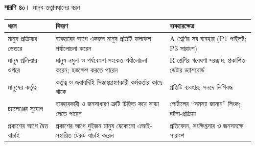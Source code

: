 \documentclass[border=10pt]{standalone}
\begin{document}
\begin{minipage}{17cm}
{\large\bfseries সারণি ৪০।}\ {\large মানব-তত্ত্বাবধানের ধরন}\par\vspace{7pt}
\small
{}
\begin{tabularx}{\linewidth}{@{}>{\hsize=0.712\hsize\raggedright\arraybackslash}X>{\hsize=1.312\hsize\raggedright\arraybackslash}X>{\hsize=0.975\hsize\raggedright\arraybackslash}X@{}}
\arrayrulecolor{bapilrule}\toprule
\rowcolor{white}\textbf{ধরন} & \textbf{বিবরণ} & \textbf{ব্যবহারক্ষেত্র} \\
\midrule
মানুষ প্রক্রিয়ার ভেতরে & ব্যবহারের আগে একজন মানুষ প্রতিটি ফলাফল পর্যালোচনা করেন & A শ্রেণির সব ব্যবহার (P1 পাইলট; P3 সারাংশ) \\
মানুষ প্রক্রিয়ার ওপরে & মানুষ নমুনা ও পর্যবেক্ষণ-সংকেত পর্যালোচনা করেন; হস্তক্ষেপ করতে পারেন & R শ্রেণির গবেষণা-সরঞ্জাম; প্রকাশিত ডেটার ড্যাশবোর্ড \\
মানুষের কর্তৃত্ব & কর্তৃত্ব ও জবাবদিহি সিদ্ধান্তগ্রহণকারী কর্মকর্তার কাছে থাকে & প্রতিটি ব্যবহার; সনদে লিপিবদ্ধ \\
চ্যালেঞ্জের সুযোগ & ব্যবহারকারী ও জনসাধারণ ত্রুটি চিহ্নিত করে সাড়া পেতে পারেন & পোর্টালের “সমস্যা জানান” লিংক; ঘটনা-প্রক্রিয়া \\
প্রকাশের আগে দ্বৈত যাচাই & প্রকাশের আগে দুইজন মানুষ যেকোনো এআই-সহায়িত টেক্সট যাচাই করেন & প্রতিবেদন, সংক্ষিপ্তসার ও জনসমক্ষে সারাংশ \\
\bottomrule
\end{tabularx}
\par{}
\end{minipage}
\end{document}

